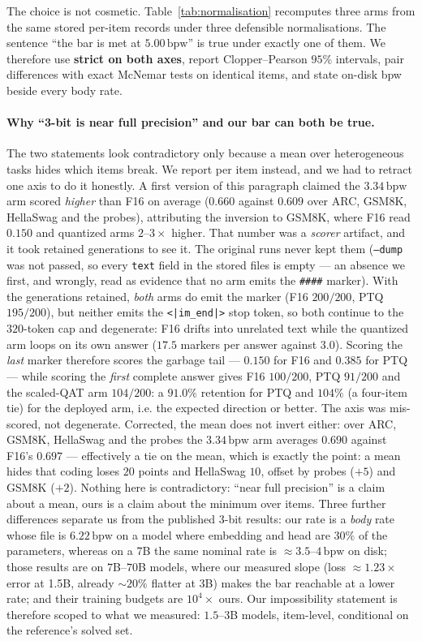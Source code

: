 \documentclass[11pt,a4paper]{article}
\newcommand{\bpw}{\,\mathrm{bpw}}
\begin{document}
The choice is not cosmetic. Table~\ref{tab:normalisation} recomputes three arms from the same
stored per-item records under three defensible normalisations. The sentence ``the bar is met at
$5.00\bpw$'' is true under exactly one of them. We therefore use \textbf{strict on both axes},
report Clopper--Pearson $95\%$ intervals, pair differences with exact McNemar tests on identical
items, and state on-disk bpw beside every body rate.

\paragraph{Why ``3-bit is near full precision'' and our bar can both be true.} The two statements
look contradictory only because a mean over heterogeneous tasks hides which items break. We report
per item instead, and we had to retract one axis to do it honestly. A first version of this
paragraph claimed the $3.34\bpw$ arm scored \emph{higher} than F16 on average ($0.660$ against
$0.609$ over ARC, GSM8K, HellaSwag and the probes), attributing the inversion to GSM8K, where F16
read $0.150$ and quantized arms $2$--$3\times$ higher. That number was a \emph{scorer} artifact, and
it took retained generations to see it. The original runs never kept them (\texttt{--dump} was not
passed, so every \texttt{text} field in the stored files is empty --- an absence we first, and
wrongly, read as evidence that no arm emits the \texttt{\#\#\#\#} marker). With the generations
retained, \emph{both} arms do emit the marker (F16 $200/200$, PTQ $195/200$), but neither emits the
\texttt{<|im\_end|>} stop token, so both continue to the $320$-token cap and degenerate: F16 drifts
into unrelated text while the quantized arm loops on its own answer ($17.5$ markers per answer
against $3.0$). Scoring the \emph{last} marker therefore scores the garbage tail --- $0.150$ for F16
and $0.385$ for PTQ --- while scoring the \emph{first} complete answer gives F16 $100/200$, PTQ
$91/200$ and the scaled-QAT arm $104/200$: a $91.0\%$ retention for PTQ and $104\%$ (a four-item
tie) for the deployed arm, i.e. the expected direction or better. The axis was mis-scored, not
degenerate. Corrected, the mean does not invert either: over ARC, GSM8K, HellaSwag and the probes
the $3.34\bpw$ arm averages $0.690$ against F16's $0.697$ --- effectively a tie on the mean, which is
exactly the point: a mean hides that coding loses $20$ points and HellaSwag $10$, offset by probes
($+5$) and GSM8K ($+2$). Nothing here is contradictory:
``near full precision'' is a claim about a mean, ours is a claim about the minimum over items. Three further differences separate us
from the published 3-bit results: our rate is a \emph{body} rate whose file is $6.22\bpw$ on a
model where embedding and head are $30\%$ of the parameters, whereas on a 7B the same nominal rate
is $\approx3.5$--$4\bpw$ on disk; those results are on $7$B--$70$B models, where our measured slope
(loss $\approx1.23\times$ error at 1.5B, already $\sim20\%$ flatter at 3B) makes the bar reachable
at a lower rate; and their training budgets are $10^4\times$ ours. Our impossibility statement is
therefore scoped to what we measured: $1.5$--$3$B models, item-level, conditional on the reference's
solved set.
\end{document}
